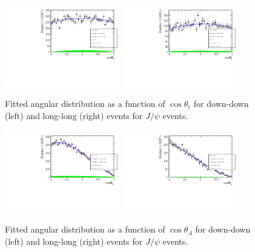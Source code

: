 \begin{figure}[h]
\centering
\includegraphics[width=0.45\textwidth]{Lmumu/figs/AngularDistribs/Fitted/Afb_DD_jpsi.pdf}
\includegraphics[width=0.45\textwidth]{Lmumu/figs/AngularDistribs/Fitted/Afb_LL_jpsi.pdf}
\caption{Fitted angular distribution as a function of $\cos\theta_\ell$ for down-down (left) and long-long (right) events for $J/\psi$ events.  }
\label{fig:AngFitJpsi}
\end{figure}

\begin{figure}[h]
\centering
\includegraphics[width=0.45\textwidth]{Lmumu/figs/AngularDistribs/Fitted/AfbB_DD_jpsi.pdf}
\includegraphics[width=0.45\textwidth]{Lmumu/figs/AngularDistribs/Fitted/AfbB_LL_jpsi.pdf}
\caption{Fitted angular distribution as a function of $\cos\theta_\Lambda$ for down-down (left) and long-long (right) events for $J/\psi$ events.  }
\label{fig:AngFitBJpsi}
\end{figure}







